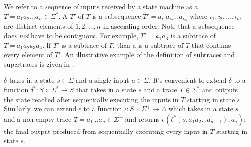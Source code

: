 We refer to a sequence of inputs received by a state machine as a
 $T = a_1 a_2 \ldots a_n \in \Sigma^*$. A 
$T'$ of $T$ is a subsequence $T' = a_{i_1} a_{i_2} \ldots a_{i_m}$ where $i_1,
i_2, \ldots, i_m$ are distinct elements of $1, 2, \ldots, n$ in ascending
order. Note that a subsequence does \emph{not} have to be contiguous. For
example, $T' = a_1 a_3$ is a subtrace of $T = a_1 a_2 a_3 a_4$. If $T'$ is a
subtrace of $T$, then a  is a subtrace of
$T$ that contains every element of $T'$. An illustrative example of the
definition of subtraces and supertraces is given in .

{}

$\delta$ takes in a state $s \in \Sigma$ and a single input $a \in \Sigma$.
It's convenient to extend $\delta$ to a function $\delta^*: S \times \Sigma^*
\to S$ that takes in a state $s$ and a trace $T \in \Sigma^*$ and outputs the
state reached after sequentially executing the inputs in $T$ starting in state
$s$. Similarly, we can extend $\epsilon$ to a function $\epsilon: S \times
\Sigma^+ \to \Lambda$ which takes in a state $s$ and a non-empty trace $T = a_1
\ldots a_n \in \Sigma^+$ and returns $\epsilon(\delta^*(s, a_1 a_2 \ldots
a_{n-1}), a_n)$: the final output produced from sequentially executing every
input in $T$ starting in state $s$.

